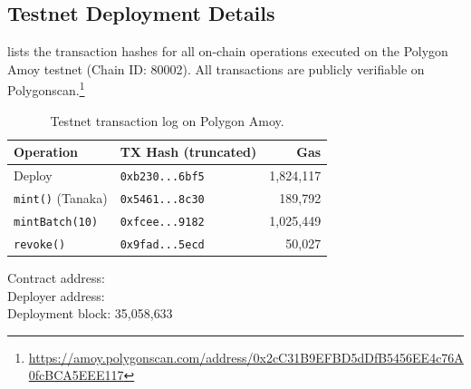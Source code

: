 \subsection{Testnet Deployment Details}
\label{app:testnet}

 lists the transaction hashes for all on-chain operations
executed on the Polygon Amoy testnet (Chain ID: 80002).
All transactions are publicly verifiable on Polygonscan.\footnote{%
\url{https://amoy.polygonscan.com/address/0x2cC31B9EFBD5dDfB5456EE4c76A0fcBCA5EEE117}}

\begin{table}[ht]
\centering
\caption{Testnet transaction log on Polygon Amoy.}
\label{tab:testnet_txs}
\footnotesize
\setlength{\tabcolsep}{2pt}
\begin{tabular}{@{}llr@{}}
\toprule
\textbf{Operation} & \textbf{TX Hash (truncated)} & \textbf{Gas} \\
\midrule
Deploy
  & \texttt{0xb230...6bf5}
  & 1{,}824{,}117 \\
\texttt{mint()} (Tanaka)
  & \texttt{0x5461...8c30}
  & 189{,}792 \\
\texttt{mintBatch(10)}
  & \texttt{0xfcee...9182}
  & 1{,}025{,}449 \\
\texttt{revoke()}
  & \texttt{0x9fad...5ecd}
  & 50{,}027 \\
\bottomrule
\end{tabular}
\end{table}

Contract address: \\
Deployer address: \\
Deployment block: 35{,}058{,}633
